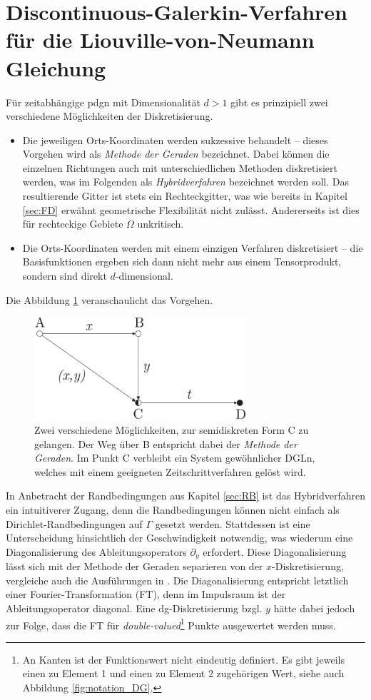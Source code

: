 \section{Discontinuous-Galerkin-Verfahren für die Liouville-von-Neumann Gleichung}\label{sec:primal}
Für zeitabhängige \ac{pdg}n mit Dimensionalität $d>1$ gibt es prinzipiell zwei verschiedene Möglichkeiten der Diskretisierung.
\begin{itemize}
  \item Die jeweiligen Orts-Koordinaten werden sukzessive behandelt -- dieses Vorgehen wird als \emph{Methode der Geraden} bezeichnet. Dabei können die einzelnen Richtungen auch mit unterschiedlichen Methoden diskretisiert werden, was im Folgenden als \emph{Hybridverfahren} bezeichnet werden soll. Das resultierende Gitter ist stets ein Rechteckgitter, was wie bereits in Kapitel \ref{sec:FD} erwähnt geometrische Flexibilität nicht zulässt. Andererseits ist dies für rechteckige Gebiete $\Omega$ unkritisch.
  \item Die Orts-Koordinaten werden mit einem einzigen Verfahren diskretisiert -- die Basisfunktionen ergeben sich dann nicht mehr aus einem Tensorprodukt, sondern sind direkt $d$-dimensional.
\end{itemize}
Die Abbildung \ref{fig:methodeDerGeraden} veranschaulicht das Vorgehen.
\begin{figure}
  \centering
  \includegraphics[width=0.7\textwidth]{files/methodeDerGeraden.pdf}
  \caption{Zwei verschiedene Möglichkeiten, zur semidiskreten Form C zu gelangen. Der Weg über B entspricht dabei der \emph{Methode der Geraden}. Im Punkt C verbleibt ein System gewöhnlicher DGLn, welches mit einem geeigneten Zeitschrittverfahren gelöst wird.}
  \label{fig:methodeDerGeraden}
\end{figure}
In Anbetracht der Randbedingungen aus Kapitel \ref{sec:RB} ist das Hybridverfahren ein intuitiverer Zugang, denn die Randbedingungen können nicht einfach als Dirichlet-Randbedingungen auf $\Gamma$ gesetzt werden. Stattdessen ist eine Unterscheidung hinsichtlich der Geschwindigkeit notwendig, was wiederum eine Diagonalisierung des Ableitungsoperators $\partial_y$ erfordert. Diese Diagonalisierung lässt sich mit der Methode der Geraden separieren von der $x$-Diskretisierung, vergleiche auch die Ausführungen in \cite{lukas1}. Die Diagonalisierung entspricht letztlich einer Fourier-Transformation (FT), denn im Impulsraum ist der Ableitungsoperator  diagonal. Eine \ac{dg}-Diskretisierung bzgl. $y$ hätte dabei jedoch zur Folge, dass die FT für \emph{double-valued}\footnote{An Kanten ist der Funktionswert nicht eindeutig definiert. Es gibt jeweils einen zu Element 1 und einen zu Element 2 zugehörigen Wert, siehe auch Abbildung \ref{fig:notation_DG}.} Punkte ausgewertet werden muss.

